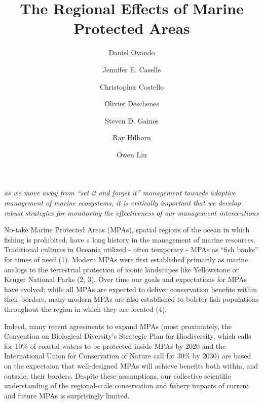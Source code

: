 \documentclass[9pt,twocolumn,twoside,lineno]{pnas-new}
\title{The Regional Effects of Marine Protected Areas}
\author[a,1]{Daniel Ovando}
\author[b]{Jennifer E. Caselle}
\author[b]{Christopher Costello}
\author[b]{Olivier Deschenes}
\author[b]{Steven D. Gaines}
\author[a]{Ray Hilborn}
\author[b]{Owen Liu}
\affil[a]{University of Washington, School of Aquatic and Fishery Sciences}
\affil[b]{University of California, Santa Barbara}
\begin{document}
\verticaladjustment{-2pt}

\maketitle
\thispagestyle{firststyle}



\emph{as we move away from ``set it and forget it'' management towards
adaptive management of marine ecosystems, it is critically important
that we develop robust strategies for monitoring the effectiveness of
our management intercentions}

No-take Marine Protected Areas (MPAs), spatial regions of the ocean in
which fishing is prohibited, have a long history in the management of
marine resources. Traditional cultures in Oceania utilized - often
temporary - MPAs as ``fish banks'' for times of need (1). Modern MPAs
were first established primarily as marine analogs to the terrestrial
protection of iconic landscapes like Yellowstone or Kruger National
Parks (2, 3). Over time our goals and expectations for MPAs have
evolved; while all MPAs are expected to deliver conservation benefits
within their borders, many modern MPAs are also established to bolster
fish populations throughout the region in which they are located (4).

Indeed, many recent agreements to expand MPAs (most proximately, the
Convention on Biological Diversity's Strategic Plan for Biodiversity,
which calls for 10\% of coastal waters to be protected inside MPAs by
2020 and the International Union for Conservation of Nature call for
30\% by 2030) are based on the expectaion that well-designed MPAs will
achieve benefits both within, and outside, their borders. Despite these
assumptions, our collective scientific understanding of the
regional-scale conservation and fishery impacts of current and future
MPAs is surprisingly limited.
\end{document}
